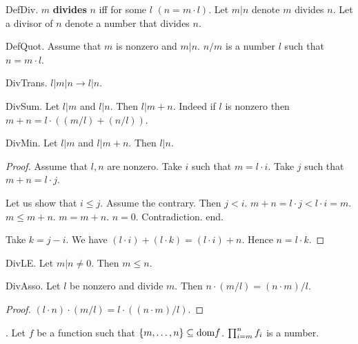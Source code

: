 \begin{axiom}
\begin{lemma}
\begin{definition}

\begin{definition} DefDiv.
$m$ {\bf divides} $n$ iff for some $l$ $(n = m \cdot l)$.
Let $m | n$ denote $m$ divides $n$.
Let a divisor of $n$ denote a number that divides $n$.
\end{definition}

\begin{definition} DefQuot.
Assume that $m$ is nonzero and $m | n$.
$n / m$ is a number $l$ such that $n = m \cdot l$.
\end{definition}

\begin{lemma} DivTrans. $l | m | n \rightarrow l | n$.
\end{lemma}

\begin{lemma} DivSum.
Let $l | m$ and $l | n$. Then $l | m + n$.
Indeed if $l$ is nonzero then 
$m + n = l \cdot ((m / l) + (n / l))$.
\end{lemma}

\begin{lemma} DivMin.
Let $l | m$ and $l | m + n$. Then $l | n$.
\end{lemma}
\begin{proof}
Assume that $l,n$ are nonzero.
Take $i$ such that $m = l \cdot i$. 
Take $j$ such that $m + n = l \cdot j$.

Let us show that $i \leq j$.
Assume the contrary. Then $j < i$.
$m+n = l \cdot j < l \cdot i = m$. 
$m \leq m+n$.
$m = m+n$. $n=0$.
Contradiction. end.
 
Take $k = j - i$.
We have $(l \cdot i) + (l \cdot k) = (l \cdot i) + n$.
Hence $n = l \cdot k$.
\end{proof}

\begin{lemma} DivLE.
Let $m | n \neq 0$. Then $m \leq n$.
\end{lemma}

\begin{lemma} DivAsso.
Let $l$ be nonzero and divide $m$.
Then $n \cdot (m / l) = (n \cdot m) / l$.\end{lemma}
\begin{proof}
$(l \cdot n) \cdot (m / l) = l \cdot ((n \cdot m) / l)$.
\end{proof}

\begin{signature}.  
Let $f$ be a function such that $\Seq{m}{n} \subseteq \text{dom} f$.
$\Product{f}{m}{n}$ is a number.
\end{signature}


\end{definition}
\end{lemma}
\end{axiom}
